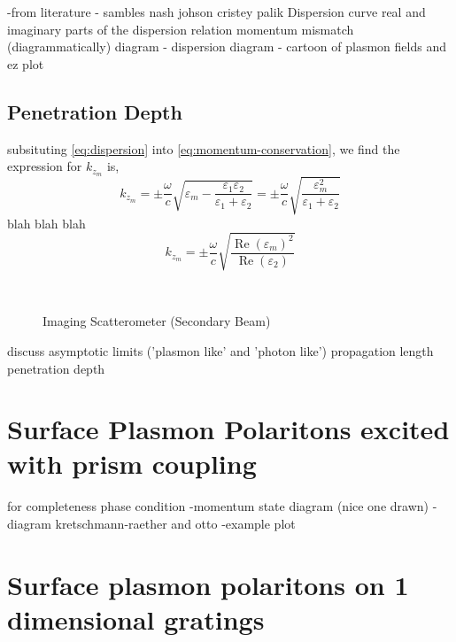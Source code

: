 \documentclass[oneside,10pt,a4paper]{book}
\begin{document}
-from literature - sambles nash johson cristey palik
Dispersion curve
real and imaginary parts of the dispersion relation
momentum mismatch (diagrammatically)
diagram - dispersion 
diagram - cartoon of plasmon fields and ez plot
\subsection{Penetration Depth}

subsituting \ref{eq:dispersion} into \ref{eq:momentum-conservation}, we find the expression for $k_{z_m}$ is,
\begin{equation}
k_{z_m}=\pm\frac{\omega}{c} \sqrt{\varepsilon_m-\frac{\varepsilon_1\varepsilon_2}{\varepsilon_1+\varepsilon_2}}=\pm\frac{\omega}{c} \sqrt{\frac{\varepsilon_m^2}{\varepsilon_1+\varepsilon_2}}
\end{equation}
blah blah blah
\begin{equation}
k_{z_m}=\pm\frac{\omega}{c}\sqrt{\frac{\operatorname{Re}{(\varepsilon_m)}^2}{\operatorname{Re}(\varepsilon_2)}}
\end{equation}


\begin{figure}
\centering
\begin{subfigure}[c]{0.4\textwidth}

\end{subfigure}
~
\begin{subfigure}[c]{0.4\textwidth}

\end{subfigure}

\caption{Imaging Scatterometer (Secondary Beam) }
\end{figure}

discuss asymptotic limits ('plasmon like' and 'photon like')
propagation length
penetration depth

\section{Surface Plasmon Polaritons excited with prism coupling}
for completeness
phase condition
-momentum state diagram (nice one drawn)
-diagram kretschmann-raether and otto
-example plot

\section{Surface plasmon polaritons on 1 dimensional gratings}
\end{document}
